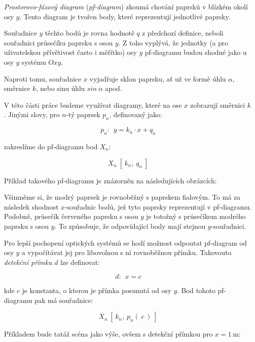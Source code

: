 \emph{Prostorovo-fázový diagram} (\emph{pf-diagram}) zkoumá chování paprsků v blízkém okolí osy $y$. Tento diagram je tvořen body, které reprezentují jednotlivé paprsky.

Souřadnice $y$ těchto bodů je rovna hodnotě $q$ z předchozí definice, neboli souřadnici průsečíku paprsku s osou $y$. Z toho vyplývá, že jednotky (a pro uživatelskou přívětivost často i měřítko) osy $y$ pf-diagramu budou shodné jako u osy $y$ systému $Oxy$.

Naproti tomu, souřadnice $x$ vyjadřuje sklon paprsku, ať už ve formě úhlu $\alpha$, směrnice $k$, nebo sinu úhlu $sin\ \alpha$ apod.

V této části práce budeme využívat diagramy, které na ose $x$ zobrazují směrnici $k$. Jinými slovy, pro $n$-tý paprsek $p_n$, definovaný jako:

\[ p_n:\ \ y = k_n \cdot x + q_n \]

zakreslíme do pf-diagramu bod $X_n$: 

\[ X_n\ [\ k_n,\ q_n\ ] \]

Příklad takového pf-diagramu je znázorněn na následujících obrázcích:


Všimněme si, že modrý paprsek je rovnoběžný s paprskem fialovým. To má za následek shodnost $x$-souřadnic bodů, jež tyto paprsky reprezentují v pf-diagramu. Podobně, průsečík červeného paprsku s osou $y$ je totožný s průsečíkem modrého paprsku s osou $y$. To způsobuje, že odpovídající body mají stejnou $y$-souřadnici.

Pro lepší pochopení optických systémů se hodí možnost odpoutat pf-diagram od osy $y$ a vypočítávat jej pro libovolnou s ní rovnoběžnou přímku. Takovouto \emph{detekční přímku} $d$ lze definovat:

\[ d:\ \ x = c \]

kde $c$ je konstanta, o kterou je přímka posunutá od osy $y$. Bod tohoto pf-diagramu pak má souřadnice:

\[ X_n\ [\ k_n,\ p_n(\ c\ )\ ] \]

Příkladem bude tatáž scéna jako výše, ovšem s detekční přímkou pro $x = 1\ \mathrm{m}$:


